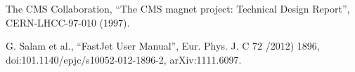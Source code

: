 \begin{thebibliography}{99}
The CMS Collaboration, “The CMS magnet project: Technical Design Report”, CERN-LHCC-97-010 (1997).


 G. Salam et al., ``FastJet User Manual'', Eur. Phys. J. C 72 /2012) 1896, doi:101.1140/epjc/s10052-012-1896-2, arXiv:1111.6097.


 


%
%
%      

%
%
%

%

%
%





\end{thebibliography}
